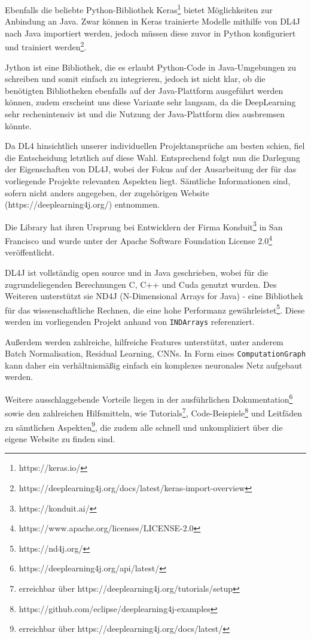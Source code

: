 \documentclass[12pt,a4paper]{article}
\begin{document}
Ebenfalls die beliebte Python-Bibliothek Keras\footnote{https://keras.io/} bietet Möglichkeiten zur Anbindung an Java. Zwar können in Keras trainierte Modelle mithilfe von DL4J nach Java importiert werden, jedoch müssen diese zuvor in Python konfiguriert und trainiert werden\footnote{https://deeplearning4j.org/docs/latest/keras-import-overview}.

Jython ist eine Bibliothek, die es erlaubt Python-Code in Java-Umgebungen zu schreiben und somit einfach zu integrieren, jedoch ist nicht klar, ob die benötigten Bibliotheken ebenfalls auf der Java-Plattform ausgeführt werden können, zudem erscheint uns diese Variante sehr langsam, da die DeepLearning sehr rechenintensiv ist und die Nutzung der Java-Plattform dies ausbremsen könnte.

Da DL4 hinsichtlich unserer individuellen Projektansprüche am besten schien, fiel die Entscheidung letztlich auf diese Wahl. Entsprechend folgt nun die Darlegung der Eigenschaften von DL4J, wobei der Fokus auf der Ausarbeitung der für das vorliegende Projekte relevanten Aspekten liegt. Sämtliche Informationen sind, sofern nicht anders angegeben, der zugehörigen Website (https://deeplearning4j.org/) entnommen.

Die Library hat ihren Ursprung bei Entwicklern der Firma Konduit\footnote{https://konduit.ai/} in San Francisco und wurde unter der Apache Software Foundation License 2.0\footnote{https://www.apache.org/licenses/LICENSE-2.0} veröffentlicht.

DL4J ist vollständig open source und in Java geschrieben, wobei für die zugrundeliegenden Berechnungen C, C++ und Cuda genutzt wurden. Des Weiteren unterstützt sie ND4J (N-Dimensional Arrays for Java) - eine Bibliothek für das wissenschaftliche Rechnen, die eine hohe Performanz gewährleistet\footnote{https://nd4j.org/}. Diese werden im vorliegenden Projekt anhand von \texttt{INDArrays} referenziert.

Außerdem werden zahlreiche, hilfreiche Features unterstützt, unter anderem Batch Normalisation, Residual Learning, CNNs. In Form eines \texttt{ComputationGraph} kann daher ein verhältnismäßig einfach ein komplexes neuronales Netz aufgebaut werden.

Weitere ausschlaggebende Vorteile liegen in der ausführlichen Dokumentation\footnote{https://deeplearning4j.org/api/latest/} sowie den zahlreichen Hilfsmitteln, wie Tutorials\footnote{erreichbar über https://deeplearning4j.org/tutorials/setup}, Code-Beispiele\footnote{https://github.com/eclipse/deeplearning4j-examples} und Leitfäden zu sämtlichen Aspekten\footnote{erreichbar über https://deeplearning4j.org/docs/latest/}, die zudem alle schnell und unkompliziert über die eigene Website zu finden sind.
\end{document}
